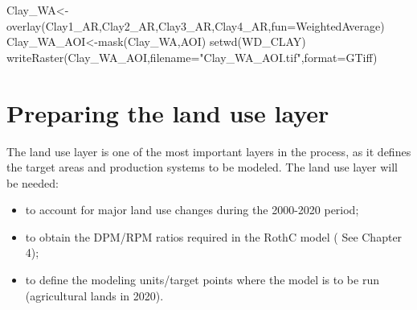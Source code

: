 \documentclass[
  10pt,
  b5paper,
]{book}
\newenvironment{Shaded}{\begin{snugshade}}{\end{snugshade}}
\newcommand{\AttributeTok}[1]{\textcolor[rgb]{0.77,0.63,0.00}{#1}}
\newcommand{\FunctionTok}[1]{\textcolor[rgb]{0.00,0.00,0.00}{#1}}
\newcommand{\NormalTok}[1]{#1}
\newcommand{\OtherTok}[1]{\textcolor[rgb]{0.56,0.35,0.01}{#1}}
\newcommand{\StringTok}[1]{\textcolor[rgb]{0.31,0.60,0.02}{#1}}
\providecommand{\tightlist}{%
  \setlength{\itemsep}{0pt}\setlength{\parskip}{0pt}}
\begin{document}
\begin{Shaded}
\begin{Highlighting}[]
\NormalTok{Clay\_WA}\OtherTok{\textless{}{-}}\FunctionTok{overlay}\NormalTok{(Clay1\_AR,Clay2\_AR,Clay3\_AR,Clay4\_AR,}\AttributeTok{fun=}\NormalTok{WeightedAverage)}
\NormalTok{Clay\_WA\_AOI}\OtherTok{\textless{}{-}}\FunctionTok{mask}\NormalTok{(Clay\_WA,AOI)}
\FunctionTok{setwd}\NormalTok{(WD\_CLAY)}
\FunctionTok{writeRaster}\NormalTok{(Clay\_WA\_AOI,}\AttributeTok{filename=}\StringTok{"Clay\_WA\_AOI.tif"}\NormalTok{,}\AttributeTok{format=}\StringTok{\textquotesingle{}GTiff\textquotesingle{}}\NormalTok{)}
\end{Highlighting}
\end{Shaded}

\hypertarget{preparing-the-land-use-layer}{%
\section{Preparing the land use layer}\label{preparing-the-land-use-layer}}

The land use layer is one of the most important layers in the process, as it defines the target areas and production systems to be modeled.
The land use layer will be needed:

\begin{itemize}
\tightlist
\item
  to account for major land use changes during the 2000-2020 period;
\item
  to obtain the DPM/RPM ratios required in the RothC model ( See Chapter 4);
\item
  to define the modeling units/target points where the model is to be run (agricultural lands in 2020).
\end{itemize}
\end{document}
